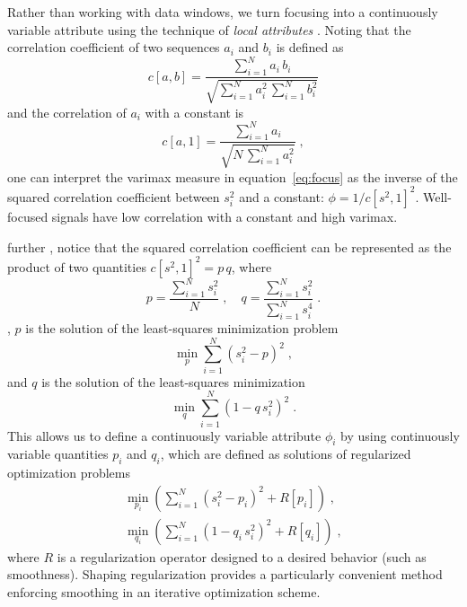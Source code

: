 Rather than working with data windows, we turn focusing into a
continuously variable attribute using the technique of
\emph{local attributes} \cite[]{attr}. Noting that the correlation
coefficient of two sequences $a_i$ and $b_i$ is defined as
\begin{equation}
  \label{eq:c}
  c[a,b] = \frac{\displaystyle \sum_{i=1}^N a_i\,b_i}{\displaystyle \sqrt{\sum_{i=1}^N a_i^2\,\sum_{i=1}^N b_i^2}}
\end{equation}
and the correlation of $a_i$ with a constant is
\begin{equation}
  \label{eq:c2}
  c[a,1] = \frac{\displaystyle \sum_{i=1}^N a_i}{\displaystyle \sqrt{N\,\sum_{i=1}^N a_i^2}}\;,
\end{equation}
one can interpret the varimax measure in equation~\ref{eq:focus} as
the inverse of the squared correlation coefficient between $s_i^2$ and
a constant: $\phi = 1/c[s^2,1]^2$. Well-focused signals  have low correlation with a constant and
 high varimax.

  further , notice that the squared correlation coefficient can
be represented as the product of two quantities $c[s^2,1]^2 = p\,q$,
where 
\begin{equation}
\label{eq:pq}
p=\frac{\displaystyle \sum_{i=1}^N s_i^2}{\displaystyle N}\;,\quad q=\frac{\displaystyle \sum_{i=1}^N s_i^2}{\displaystyle \sum_{i=1}^N s_i^4}\;.
\end{equation}
, $p$ is the solution of the least-squares
minimization problem
\begin{equation}
  \label{eq:p}
  \min_p \sum_{i=1}^N \left(s_i^2 - p\right)^2\;,
\end{equation}
and $q$ is the
solution of the least-squares minimization
\begin{equation}
  \label{eq:q}
  \min_q \sum_{i=1}^N \left(1 - q\,s_i^2\right)^2\;.
\end{equation}
This allows us to define a continuously variable attribute $\phi_i$ by
using continuously variable quantities $p_i$ and $q_i$, which are
defined as solutions of regularized optimization problems
\begin{eqnarray}
  \label{eq:pt}
  \min_{p_i} 
  \left(\sum_{i=1}^N \left(s_i^2 - p_i\right)^2 + R\left[p_i\right]\right)\;, \\
   \label{eq:qt}
   \min_{q_i}
   \left(\sum_{i=1}^N \left(1 - q_i\,s_i^2\right)^2 + R\left[q_i\right]\right)\;,
\end{eqnarray}
where $R$ is a regularization operator designed to   a desired behavior (such as
smoothness). Shaping regularization \cite[]{shape} provides a
particularly convenient method   enforcing smoothing
in an iterative optimization scheme.

